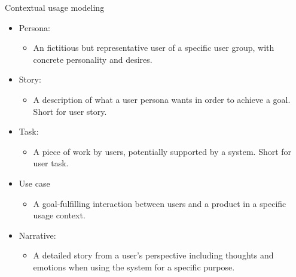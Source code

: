 \begin{Slide}{Contextual usage modeling}

\begin{itemize}
\item Persona:
\begin{itemize}
\item An fictitious but representative user of a specific user group, with concrete personality and desires.
\end{itemize}
\item Story:
\begin{itemize}
\item A description of what a user persona wants in order to achieve a goal. Short for user story.
\end{itemize}
\item Task: 
\begin{itemize}
\item A piece of work by users, potentially supported by a system. Short for user task.
\end{itemize}
\item Use case
\begin{itemize}
\item A goal-fulfilling interaction between users and a product in a specific usage context.
\end{itemize}
\item Narrative:
\begin{itemize}
\item A detailed story from a user's perspective including thoughts and emotions when using the system for a specific purpose.

\end{itemize}
\end{itemize}
\end{Slide}